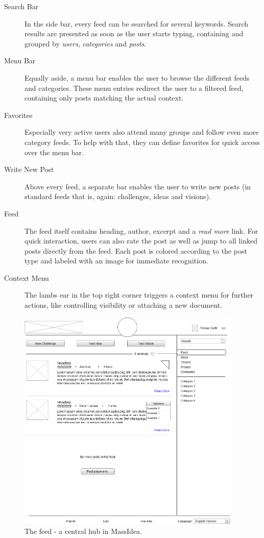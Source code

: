 \documentclass[a4paper, notitlepage, oneside]{article}
\begin{document}
\begin{description}
	\item[Search Bar] In the side bar, every feed can be searched for several keywords. Search results are presented as soon as the user starts typing, containing and grouped by \emph{users}, \emph{categories} and \emph{posts}.
	\item[Menu Bar] Equally aside, a menu bar enables the user to browse the different feeds and categories. These menu entries redirect the user to a filtered feed, containing only posts matching the actual context.
	\item[Favorites] Especially very active users also attend many groups and follow even more category feeds. To help with that, they can define favorites for quick access over the menu bar. 
	\item[Write New Post] Above every feed, a separate bar enables the user to write new posts (in standard feeds that is, again: challenges, ideas and visions). 
	\item[Feed] The feed itself contains heading, author, excerpt and a \emph{read more} link. For quick interaction, users can also rate the post as well as jump to all linked posts directly from the feed. Each post is colored according to the post type and labeled with an image for immediate recognition. 
	\item[Context Menu] The lambs ear in the top right corner triggers a context menu for further actions, like controlling visibility or attaching a new document.
\end{description}

\begin{figure}[htb]
	\centering
	\includegraphics[width=0.95\textwidth]{feed}
	\caption{The feed - a central hub in MassIdea.}
	\label{fig:feed}
\end{figure}
\end{document}
